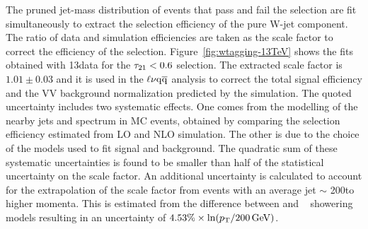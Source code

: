 The pruned jet-mass distribution of events that pass and fail the \nsubj selection are fit simultaneously to extract the selection efficiency of the pure W-jet component. The ratio of data and simulation efficiencies are taken as the scale factor to correct the efficiency of the \nsubj selection. Figure~\ref{fig:wtagging-13TeV} shows the fits obtained with 13\TeV data for the $\tau_{21} < 0.6$ selection. 
The extracted scale factor is $1.01 \pm 0.03$ and it is used in the $\ell\nu\mathrm{q}\overline{\mathrm{q}}$ analysis to correct the total signal efficiency and the VV background normalization predicted by the simulation.
The quoted uncertainty includes two systematic effects. One comes from the modelling of the nearby jets and \pt spectrum in \ttbar MC events, obtained by comparing the selection efficiency estimated from LO and NLO \ttbar simulation. %
The other is due to the choice of the models used to fit signal and background.
The quadratic sum of these systematic uncertainties is found to be smaller than half of the statistical uncertainty on the scale factor. An additional uncertainty is calculated to account for the extrapolation of the scale factor from \ttbar events with an average jet \pt $\sim$ 200\GeV to higher momenta. This is estimated from the difference between  and \HERWIG{++}~\cite{Bahr:2008pv} showering models resulting in an uncertainty of $4.53\% \times \displaystyle \ln(p_{\mathrm{T}}/200\,\text{Ge\hspace{-.08em}V})$.

